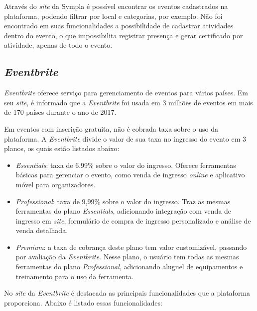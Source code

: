 Através do \textit{site} da Sympla é possível encontrar os eventos cadastrados na plataforma, podendo filtrar por local e categorias, por exemplo. Não foi encontrado em suas funcionalidades a possibilidade de cadastrar atividades dentro do evento, o que impossibilita registrar presença e gerar certificado por atividade, apenas de todo o evento.

\subsection{\textit{Eventbrite}}

\textit{Eventbrite} oferece serviço para gerenciamento de eventos para vários países. Em seu \textit{site}, é informado que a \textit{Eventbrite} foi usada em 3 milhões de eventos em mais de 170 países durante o ano de 2017.

Em eventos com inscrição gratuita, não é cobrada taxa sobre o uso da plataforma. A \textit{Eventbrite} divide o valor de sua taxa no ingresso do evento em 3 planos, os quais estão listados abaixo:

\begin{itemize}
    \item \textit{Essentials}: taxa de 6.99\% sobre o valor do ingresso. Oferece ferramentas básicas para gerenciar o evento, como venda de ingresso \textit{online} e aplicativo móvel para organizadores.
    \item \textit{Professional}: taxa de 9,99\% sobre o valor do ingresso. Traz as mesmas ferramentas do plano \textit{Essentials}, adicionando integração com venda de ingresso em \textit{site}, formulário de compra de ingresso personalizado e análise de venda detalhada.
    \item \textit{Premium}: a taxa de cobrança deste plano tem valor customizável, passando por avaliação da \textit{Eventbrite}. Nesse plano, o usuário tem todas as mesmas ferramentas do plano \textit{Professional}, adicionando aluguel de equipamentos e treinamento para o uso da ferramenta.
\end{itemize}

No \textit{site} da \textit{Eventbrite} é destacada as principais funcionalidades que a plataforma proporciona. Abaixo é listado essas funcionalidades:


